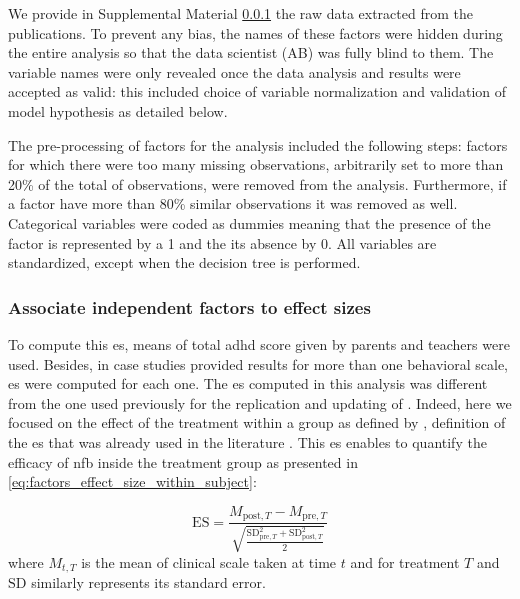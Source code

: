 We provide in Supplemental Material \ref{} the raw data extracted from the publications. To prevent any bias, the names of these factors were hidden during the entire analysis so that the data scientist (AB) was fully blind to them. The variable names were only revealed once the data 
analysis and results were accepted as valid: this included choice of variable
normalization and validation of model hypothesis as detailed below.

The pre-processing of factors for the analysis included the following steps: factors for which there were too many missing observations, 
arbitrarily set to more than 20\% of the total of observations, were removed from the analysis. Furthermore, if a factor have more than 
80\% similar observations it was removed as well. Categorical variables were coded as dummies
meaning that the presence of the factor is represented by a 1 and the its absence by 0. All variables are standardized, 
except when the decision tree is performed. 

\subsubsection{Associate independent factors to effect sizes}

To compute this \gls{es}, means of total \gls{adhd} score given by parents and teachers were used. Besides, in case studies provided results 
for more than one behavioral scale, \gls{es} were computed for each one. The \gls{es} computed in this analysis was different from the one 
used previously for the replication and updating of \citet{Cortese2016}. Indeed, here we focused on the effect of the treatment within 
a group as defined by \citet{Cohen1988}, definition of the \gls{es} that was already used in the literature \citep{Arns2009, Maurizio2014, 
Strehl2017}. This \gls{es} enables to quantify the efficacy of \gls{nfb} inside the treatment group as presented in \cref{eq:factors_effect_size_within_subject}:

\begin{equation}
\label{eq:factors_effect_size_within_subject}
\text{ES} = \frac{M_{\text{post},T} - M_{\text{pre},T}}{\sqrt{\frac{\text{SD}_{\text{pre},T}^2 + \text{SD}_{\text{post},T}^2}{2}}}
\end{equation} 
where $M_{t,T}$ is the mean of clinical scale taken at time $t$ and for treatment $T$ and $\text{SD}$ similarly represents its standard error.

